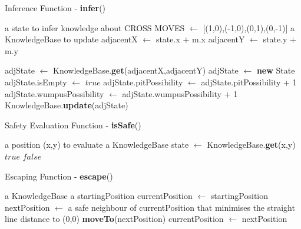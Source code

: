 \documentclass[11pt,a4paper]{article}
\begin{document}
\begin{algorithm}
\caption{Inference Function - \textbf{infer}()}
\label{infer}
\begin{algorithmic}[1]
\REQUIRE a state to infer knowledge about
\REQUIRE CROSS MOVES $\leftarrow$ [(1,0),(-1,0),(0,1),(0,-1)]
\REQUIRE a KnowledgeBase to update
\STATE adjacentX $\leftarrow$ state.x $+$ m.x 
\STATE adjacentY $\leftarrow$ state.y $+$ m.y

\STATE adjState $\leftarrow$ KnowledgeBase.\textbf{get}(adjacentX,adjacentY)
\ELSE
\STATE adjState $\leftarrow$ \textbf{new} State
\ENDIF
\STATE
{}
\STATE adjState.isEmpty $\leftarrow$ $true$
\ELSE
{}
\STATE adjState.pitPossibility $\leftarrow$ adjState.pitPossibility + 1
\ENDIF
{}
\STATE adjState.wumpusPossibility $\leftarrow$ adjState.wumpusPossibility + 1
\ENDIF
\ENDIF
\STATE KnowledgeBase.\textbf{update}(adjState)
\ENDFOR
\end{algorithmic}
\end{algorithm}

\newpage

\begin{algorithm}
\caption{Safety Evaluation Function - \textbf{isSafe}()}
\label{isSafe}
\begin{algorithmic}[1]
\REQUIRE a position (x,y) to evaluate
\REQUIRE a KnowledgeBase
\STATE state $\leftarrow$ KnowledgeBase.\textbf{get}(x,y)
\RETURN $true$
\ELSE
\RETURN $false$
\ENDIF
\end{algorithmic}
\end{algorithm}

\begin{algorithm}
\caption{Escaping Function - \textbf{escape}()}
\label{escape}
\begin{algorithmic}[1]
\REQUIRE a KnowledgeBase
\REQUIRE a startingPosition
\STATE currentPosition $\leftarrow$ startingPosition
\REPEAT
\STATE nextPosition $\leftarrow$ a safe neighbour of currentPosition that minimises the straight line distance to (0,0)
\STATE \textbf{moveTo}(nextPosition)
\STATE currentPosition $\leftarrow$ nextPosition
\end{algorithmic}
\end{algorithm}
\end{document}
